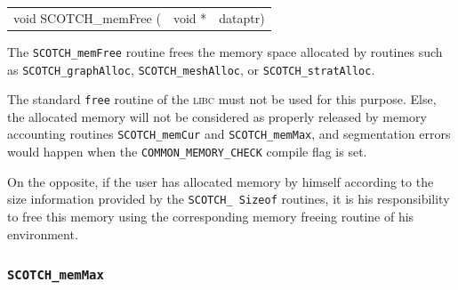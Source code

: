 \begin{itemize}
\progsyn

{\tt\begin{tabular}{l@{}ll}
void SCOTCH\_memFree ( & void * & dataptr)
\end{tabular}}

\progdes

The {\tt SCOTCH\_memFree} routine frees the memory space allocated
by routines such as {\tt SCOTCH\_\lbt graph\lbt Alloc},
{\tt SCOTCH\_\lbt mesh\lbt Alloc}, or
{\tt SCOTCH\_\lbt strat\lbt Alloc}.

The standard {\tt free} routine of the \textsc{libc} must not be
used for this purpose. Else, the allocated memory will not be
considered as properly released by memory accounting routines
{\tt SCOTCH\_\lbt mem\lbt Cur} and {\tt SCOTCH\_\lbt mem\lbt Max},
and segmentation errors would happen when the
{\tt COMMON\_\lbt MEMORY\_\lbt CHECK} compile flag is set.

On the opposite, if the user has allocated memory by himself according
to the size information provided by the {\tt SCOTCH\_\lbt *\lbt
Sizeof} routines, it is his responsibility to free this memory using
the corresponding memory freeing routine of his environment.
\end{itemize}

\subsubsection{{\tt SCOTCH\_memMax}}


